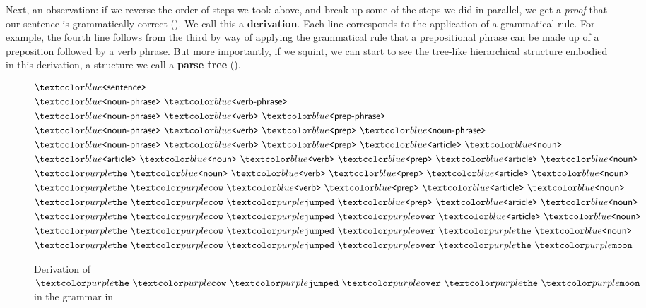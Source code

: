 Next, an observation: if we reverse the order of steps we took above, and break up some of the steps we did in parallel, we get a \textit{proof} that our sentence is grammatically correct ().
We call this a \textbf{derivation}.
Each line corresponds to the application of a grammatical rule.
For example, the fourth line follows from the third by way of applying the grammatical rule that a prepositional phrase can be made up of a preposition followed by a verb phrase.
But more importantly, if we squint, we can start to see the tree-like hierarchical structure embodied in this derivation, a structure we call a \textbf{parse tree} ().

\begin{figure}
  \begin{align*}
    & \bnfnt{sentence} \\
    & \bnfnt{noun-phrase} \ \bnfnt{verb-phrase} \\
    & \bnfnt{noun-phrase} \ \bnfnt{verb} \ \bnfnt{prep-phrase} \\
    & \bnfnt{noun-phrase} \ \bnfnt{verb} \ \bnfnt{prep} \ \bnfnt{noun-phrase} \\
    & \bnfnt{noun-phrase} \ \bnfnt{verb} \ \bnfnt{prep} \ \bnfnt{article} \ \bnfnt{noun} \\
    & \bnfnt{article} \ \bnfnt{noun} \ \bnfnt{verb} \ \bnfnt{prep} \ \bnfnt{article} \ \bnfnt{noun} \\
    & \bnft{the} \ \bnfnt{noun} \ \bnfnt{verb} \ \bnfnt{prep} \ \bnfnt{article} \ \bnfnt{noun} \\
    & \bnft{the} \ \bnft{cow} \ \bnfnt{verb} \ \bnfnt{prep} \ \bnfnt{article} \ \bnfnt{noun} \\
    & \bnft{the} \ \bnft{cow} \ \bnft{jumped} \ \bnfnt{prep} \ \bnfnt{article} \ \bnfnt{noun} \\
    & \bnft{the} \ \bnft{cow} \ \bnft{jumped} \ \bnft{over} \ \bnfnt{article} \ \bnfnt{noun} \\
    & \bnft{the} \ \bnft{cow} \ \bnft{jumped} \ \bnft{over} \ \bnft{the} \ \bnfnt{noun} \\
    & \bnft{the} \ \bnft{cow} \ \bnft{jumped} \ \bnft{over} \ \bnft{the} \ \bnft{moon}
  \end{align*}
  \caption{Derivation of $\bnft{the} \ \bnft{cow} \ \bnft{jumped} \ \bnft{over} \ \bnft{the} \ \bnft{moon}$ in the grammar in }
  \label{fig:cow-deriv}
\end{figure}

